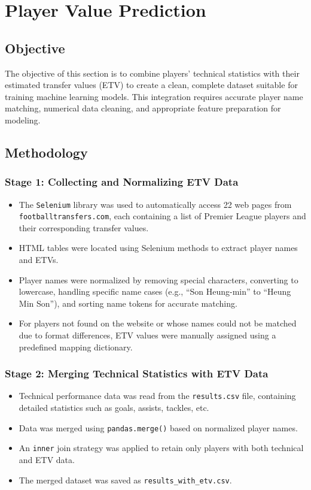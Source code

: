 \documentclass[12pt,a4paper]{article}
\begin{document}
\section{Player Value Prediction}

\subsection{Objective}
The objective of this section is to combine players' technical statistics with their estimated transfer values (ETV) to create a clean, complete dataset suitable for training machine learning models. This integration requires accurate player name matching, numerical data cleaning, and appropriate feature preparation for modeling.

\subsection{Methodology}

\subsubsection{Stage 1: Collecting and Normalizing ETV Data}
\begin{itemize}
    \item The \texttt{Selenium} library was used to automatically access 22 web pages from \texttt{footballtransfers.com}, each containing a list of Premier League players and their corresponding transfer values.
    \item HTML tables were located using Selenium methods to extract player names and ETVs.
    \item Player names were normalized by removing special characters, converting to lowercase, handling specific name cases (e.g., ``Son Heung-min'' to ``Heung Min Son''), and sorting name tokens for accurate matching.
    \item For players not found on the website or whose names could not be matched due to format differences, ETV values were manually assigned using a predefined mapping dictionary.
\end{itemize}

\subsubsection{Stage 2: Merging Technical Statistics with ETV Data}
\begin{itemize}
    \item Technical performance data was read from the \texttt{results.csv} file, containing detailed statistics such as goals, assists, tackles, etc.
    \item Data was merged using \texttt{pandas.merge()} based on normalized player names.
    \item An \texttt{inner} join strategy was applied to retain only players with both technical and ETV data.
    \item The merged dataset was saved as \texttt{results\_with\_etv.csv}.
\end{itemize}
\end{document}
